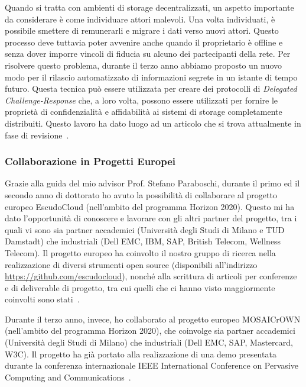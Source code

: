 \documentclass{article}
\begin{document}
\medskip
Quando si tratta con ambienti di storage decentralizzati, un aspetto importante da considerare è come individuare attori malevoli. Una volta individuati, è possibile smettere di remunerarli e migrare i dati verso nuovi attori. Questo processo deve tuttavia poter avvenire anche quando il proprietario è offline e senza dover imporre vincoli di fiducia su alcuno dei partecipanti della rete. Per risolvere questo problema, durante il terzo anno abbiamo proposto un nuovo modo per il rilascio automatizzato di informazioni segrete in un istante di tempo futuro. Questa tecnica può essere utilizzata per creare dei protocolli di {\em Delegated Challenge-Response} che, a loro volta, possono essere utilizzati per fornire le proprietà di confidenzialità e affidabilità ai sistemi di storage completamente distribuiti. Questo lavoro ha dato luogo ad un articolo che si trova attualmente in fase di revisione~\cite{ityt}.

\subsubsection*{Collaborazione in Progetti Europei}

Grazie alla guida del mio advisor Prof. Stefano Paraboschi, durante il primo ed il secondo anno di dottorato ho avuto la possibilità di collaborare al progetto europeo EscudoCloud (nell’ambito del programma Horizon 2020). Questo mi ha dato l’opportunità di conoscere e lavorare con gli altri partner del progetto, tra i quali vi sono sia partner accademici (Università degli Studi di Milano e TUD Damstadt) che industriali (Dell EMC, IBM, SAP, British Telecom, Wellness Telecom).
Il progetto europeo ha coinvolto il nostro gruppo di ricerca nella realizzazione di diversi strumenti open source (disponibili all’indirizzo \url{https://github.com/escudocloud}), nonché alla scrittura di articoli per conferenze~\cite{wiscs,cscloud,cns,spc} e di deliverable di progetto, tra cui quelli che ci hanno visto maggiormente coinvolti sono stati~\cite{d26,d35,d44}.

\medskip

Durante il terzo anno, invece, ho collaborato al progetto europeo MOSAICrOWN (nell'ambito del programma Horizon 2020), che coinvolge sia partner accademici (Università degli Studi di Milano) che industriali (Dell EMC, SAP, Mastercard, W3C). Il progetto ha già portato alla realizzazione di una demo presentata durante la conferenza internazionale IEEE International Conference on Pervasive Computing and Communications~\cite{percom}.
\end{document}
